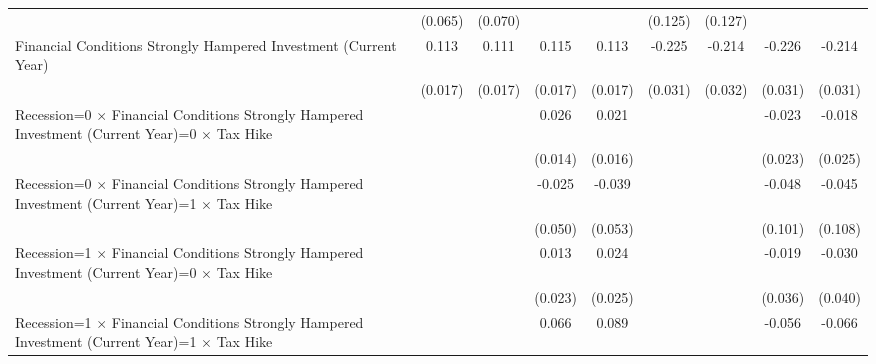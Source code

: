 {\begin{tabular}{l*{8}{c}}
                    &     (0.065)         &     (0.070)         &                     &                     &     (0.125)         &     (0.127)         &                     &                     \\
Financial Conditions Strongly Hampered Investment (Current Year)&       0.113\sym{***}&       0.111\sym{***}&       0.115\sym{***}&       0.113\sym{***}&      -0.225\sym{***}&      -0.214\sym{***}&      -0.226\sym{***}&      -0.214\sym{***}\\
                    &     (0.017)         &     (0.017)         &     (0.017)         &     (0.017)         &     (0.031)         &     (0.032)         &     (0.031)         &     (0.031)         \\
Recession=0 $\times$ Financial Conditions Strongly Hampered Investment (Current Year)=0 $\times$ Tax Hike&                     &                     &       0.026\sym{*}  &       0.021         &                     &                     &      -0.023         &      -0.018         \\
                    &                     &                     &     (0.014)         &     (0.016)         &                     &                     &     (0.023)         &     (0.025)         \\
Recession=0 $\times$ Financial Conditions Strongly Hampered Investment (Current Year)=1 $\times$ Tax Hike&                     &                     &      -0.025         &      -0.039         &                     &                     &      -0.048         &      -0.045         \\
                    &                     &                     &     (0.050)         &     (0.053)         &                     &                     &     (0.101)         &     (0.108)         \\
Recession=1 $\times$ Financial Conditions Strongly Hampered Investment (Current Year)=0 $\times$ Tax Hike&                     &                     &       0.013         &       0.024         &                     &                     &      -0.019         &      -0.030         \\
                    &                     &                     &     (0.023)         &     (0.025)         &                     &                     &     (0.036)         &     (0.040)         \\
Recession=1 $\times$ Financial Conditions Strongly Hampered Investment (Current Year)=1 $\times$ Tax Hike&                     &                     &       0.066         &       0.089         &                     &                     &      -0.056         &      -0.066         \\

\end{tabular}}
